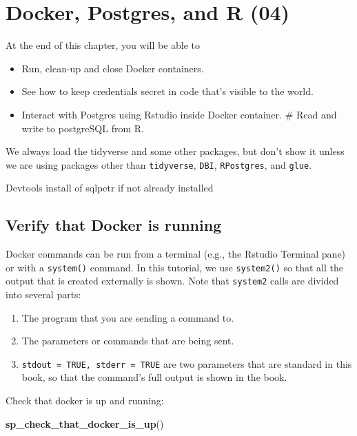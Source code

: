 \documentclass[]{book}
\newenvironment{Shaded}{\begin{snugshade}}{\end{snugshade}}
\newcommand{\KeywordTok}[1]{\textcolor[rgb]{0.13,0.29,0.53}{\textbf{#1}}}
\newcommand{\NormalTok}[1]{#1}
\providecommand{\tightlist}{%
  \setlength{\itemsep}{0pt}\setlength{\parskip}{0pt}}
\theoremstyle{definition}
\theoremstyle{definition}
\theoremstyle{definition}
\theoremstyle{remark}
\begin{document}
\hypertarget{docker-postgres-and-r-04}{%
\chapter{Docker, Postgres, and R (04)}\label{docker-postgres-and-r-04}}

At the end of this chapter, you will be able to

\begin{itemize}
\tightlist
\item
  Run, clean-up and close Docker containers.
\item
  See how to keep credentials secret in code that's visible to the
  world.
\item
  Interact with Postgres using Rstudio inside Docker container. \# Read
  and write to postgreSQL from R.
\end{itemize}

We always load the tidyverse and some other packages, but don't show it
unless we are using packages other than \texttt{tidyverse},
\texttt{DBI}, \texttt{RPostgres}, and \texttt{glue}.

Devtools install of sqlpetr if not already installed

\hypertarget{verify-that-docker-is-running}{%
\section{Verify that Docker is
running}\label{verify-that-docker-is-running}}

Docker commands can be run from a terminal (e.g., the Rstudio Terminal
pane) or with a \texttt{system()} command. In this tutorial, we use
\texttt{system2()} so that all the output that is created externally is
shown. Note that \texttt{system2} calls are divided into several parts:

\begin{enumerate}
\def\labelenumi{\arabic{enumi}.}
\tightlist
\item
  The program that you are sending a command to.
\item
  The parameters or commands that are being sent.
\item
  \texttt{stdout\ =\ TRUE,\ stderr\ =\ TRUE} are two parameters that are
  standard in this book, so that the command's full output is shown in
  the book.
\end{enumerate}

Check that docker is up and running:

\begin{Shaded}
\begin{Highlighting}[]
\KeywordTok{sp_check_that_docker_is_up}\NormalTok{()}
\end{Highlighting}
\end{Shaded}
\end{document}
